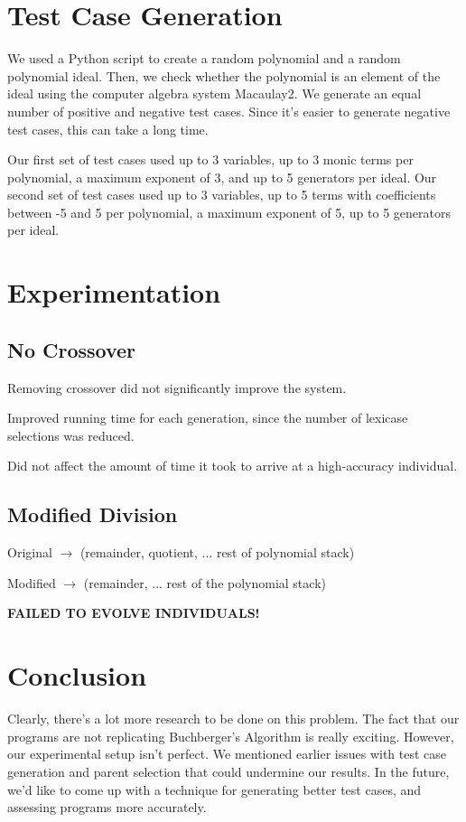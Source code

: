 \documentclass[20pt]{extarticle}
\begin{document}
\newpage
\section*{Test Case Generation}

We used a Python script to create a random polynomial and a random polynomial ideal.
Then, we check whether the polynomial is an element of the ideal using the computer algebra system Macaulay2.
We generate an equal number of positive and negative test cases.
Since it's easier to generate negative test cases, this can take a long time.

Our first set of test cases used up to 3 variables, up to 3 monic terms per polynomial, a maximum exponent of 3, and up to 5 generators per ideal.
Our second set of test cases used up to 3 variables, up to 5 terms with coefficients between -5 and 5 per polynomial, a maximum exponent of 5, up to 5 generators per ideal.


\newpage
\section*{Experimentation}
\subsection*{No Crossover}

Removing crossover did not significantly improve the system.

Improved running time for each generation, since the number of lexicase selections was reduced. 

Did not affect the amount of time it took to arrive at a high-accuracy individual.

\subsection*{Modified Division}

\noindent Original $\rightarrow$ (remainder, quotient, ... rest of polynomial stack)

\noindent Modified $\rightarrow$ (remainder, ... rest of the polynomial stack)

\noindent \textbf{FAILED TO EVOLVE INDIVIDUALS!}


\newpage
\section*{Conclusion}

Clearly, there's a lot more research to be done on this problem.
The fact that our programs are not replicating Buchberger's Algorithm is really exciting.
However, our experimental setup isn't perfect.
We mentioned earlier issues with test case generation and parent selection that could undermine our results.
In the future, we'd like to come up with a technique for generating better test cases, and assessing programs more accurately.
\end{document}
